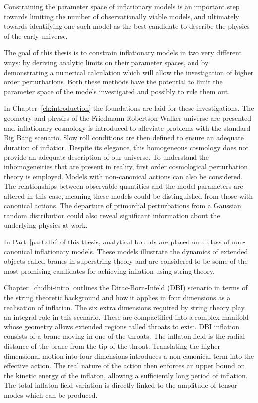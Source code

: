 Constraining the parameter space of inflationary models is an important step
towards limiting the number of observationally viable models, and ultimately
towards identifying one such model as the best candidate to describe the
physics of the early
universe. 


The goal of this thesis is to constrain inflationary models in two very different
ways: by deriving analytic limits on their parameter spaces, and by demonstrating
a numerical calculation which will allow the investigation of higher order
perturbations. Both these methods have the potential to limit the
parameter space of the models investigated and possibly to rule them out.


In Chapter~\ref{ch:introduction} the foundations are laid for these investigations.
The geometry and physics of the Friedmann-Robertson-Walker universe are presented and
inflationary cosmology is introduced to alleviate problems with the standard Big
Bang scenario. Slow roll conditions are then defined to ensure an adequate duration
of inflation. Despite its elegance, this homogeneous cosmology does not provide an
adequate description of our universe. To understand the inhomogeneities that
are present in reality, first order
cosmological perturbation theory is employed. Models with non-canonical
actions can also be considered. The relationships between observable quantities and
the model parameters are altered in this case, meaning these models could be
distinguished from those with canonical actions. The departure of primordial
perturbations from a Gaussian random distribution could also reveal significant
information about the underlying physics at work.


In Part~\ref{part:dbi} of this thesis, analytical bounds are placed on a class of
non-canonical inflationary models. These models illustrate the dynamics of
extended objects called branes in superstring theory and are considered to be some of
the most promising candidates for achieving inflation using string theory.

Chapter~\ref{ch:dbi-intro} outlines the Dirac-Born-Infeld (DBI) scenario in
terms of the string theoretic background and how it applies in four dimensions
as a realisation of inflation. The six extra dimensions required by string theory
play an integral role in this scenario. These are compactified into a complex
manifold whose geometry allows extended regions called throats to exist. DBI
inflation consists of a brane moving in one of the throats. The inflaton field is
the radial distance of the brane from the tip of the throat. Translating the
higher-dimensional motion into four dimensions introduces a non-canonical term into
the
effective action. The real nature of the action then enforces an upper bound on the
kinetic energy of the inflaton, allowing a sufficiently long period of inflation. The
total inflaton field variation is directly linked to the
amplitude of tensor modes which can be produced.


